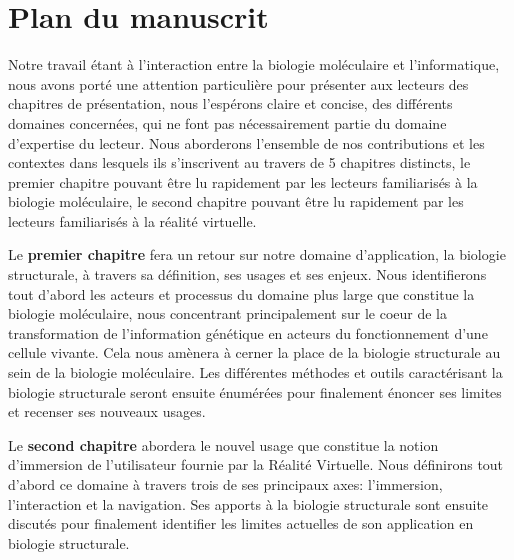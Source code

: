 

\section*{Plan du manuscrit}

Notre travail étant à l'interaction entre la biologie moléculaire et l'informatique, nous avons porté une attention particulière pour présenter aux lecteurs des chapitres de présentation, nous l'espérons claire et concise, des différents domaines concernées, qui ne font pas nécessairement partie du domaine d'expertise du lecteur. Nous aborderons l'ensemble de nos contributions et les contextes dans lesquels ils s'inscrivent au travers de 5 chapitres distincts, le premier chapitre pouvant être lu rapidement par les lecteurs familiarisés à la biologie moléculaire, le second chapitre pouvant être lu rapidement par les lecteurs familiarisés à la réalité virtuelle.

Le \textbf{premier chapitre} fera un retour sur notre domaine d'application, la biologie structurale, à travers sa définition, ses usages et ses enjeux. Nous identifierons tout d'abord les acteurs et processus du domaine plus large que constitue la biologie moléculaire, nous concentrant principalement sur le coeur de la transformation de l'information génétique en acteurs du fonctionnement d'une cellule vivante. Cela nous amènera à cerner la place de la biologie structurale au sein de la biologie moléculaire. Les différentes méthodes et outils caractérisant la biologie structurale seront ensuite énumérées pour finalement énoncer ses limites et recenser ses nouveaux usages. 

Le \textbf{second chapitre} abordera le nouvel usage que constitue la notion d'immersion de l'utilisateur fournie par la Réalité Virtuelle. Nous définirons tout d'abord ce domaine à travers trois de ses principaux axes: l'immersion, l'interaction et la navigation. Ses apports à la biologie structurale sont ensuite discutés pour finalement identifier les limites actuelles de son application en biologie structurale.

